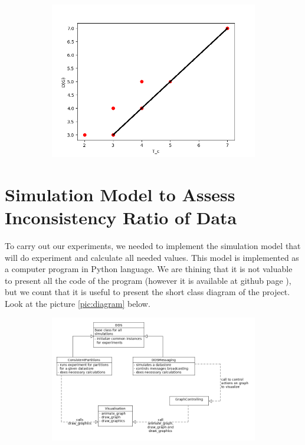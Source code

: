 \documentclass{llncs}
\begin{document}
\begin{figure}
\begin{subfigure}{0.5\linewidth}
\centering\includegraphics[scale=0.4]{images/1000-consistency-convergence.png}
\end{subfigure}
\end{figure}
\newpage

\section{Simulation Model to Assess Inconsistency Ratio of Data}\label{sec:simulation}

To carry out our experiments, we needed to implement the simulation model that will do experiment and calculate all needed values. This model is implemented as a computer program in Python language. We are thining that it is not valuable to present all the code of the program (however it is available at github page \cite{bib:github_dds}), but we count that it is useful to present the short class diagram of the project.
Look at the picture \ref{pic:diagram} below.

\begin{figure}\label{pic:diagram}
\begin{subfigure}{0.5\linewidth}
\centering\includegraphics[scale=0.4]{images/dds-class-diagram.png}
\end{subfigure}
\end{figure}
\end{document}
